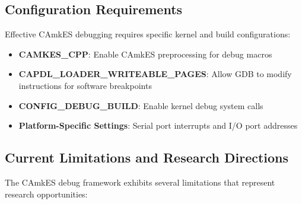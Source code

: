 \documentclass[11pt,a4paper]{article}
\begin{document}
\subsection{Configuration Requirements}

Effective CAmkES debugging requires specific kernel and build configurations:

\begin{itemize}
\item \textbf{CAMKES\_CPP}: Enable CAmkES preprocessing for debug macros
\item \textbf{CAPDL\_LOADER\_WRITEABLE\_PAGES}: Allow GDB to modify instructions for software breakpoints
\item \textbf{CONFIG\_DEBUG\_BUILD}: Enable kernel debug system calls
\item \textbf{Platform-Specific Settings}: Serial port interrupts and I/O port addresses
\end{itemize}

\subsection{Current Limitations and Research Directions}

The CAmkES debug framework exhibits several limitations that represent research opportunities:
\end{document}

